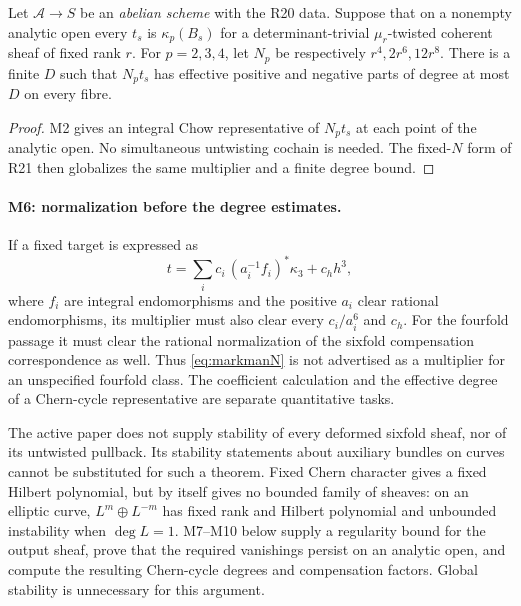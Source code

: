 \begin{proposition}\label{M4}
Let $\mathcal A\to S$ be an \emph{abelian scheme} with the R20 data. Suppose that on a nonempty analytic open every $t_s$ is $\kappa_p(B_s)$ for a determinant-trivial $\mu_r$-twisted coherent sheaf of fixed rank $r$. For $p=2,3,4$, let $N_p$ be respectively $r^4,2r^6,12r^8$. There is a finite $D$ such that $N_pt_s$ has effective positive and negative parts of degree at most $D$ on every fibre.
\end{proposition}
\begin{proof}
M2 gives an integral Chow representative of $N_pt_s$ at each point of the analytic open. No simultaneous untwisting cochain is needed. The fixed-$N$ form of R21 then globalizes the same multiplier and a finite degree bound.
\end{proof}

\paragraph{M6: normalization before the degree estimates.}
If a fixed target is expressed as
\[
 t=\sum_i c_i\,(a_i^{-1}f_i)^*\kappa_3+c_hh^3,
\]
where $f_i$ are integral endomorphisms and the positive $a_i$ clear rational endomorphisms, its multiplier must also clear every $c_i/a_i^6$ and $c_h$. For the fourfold passage it must clear the rational normalization of the sixfold compensation correspondence as well. Thus \eqref{eq:markmanN} is not advertised as a multiplier for an unspecified fourfold class. The coefficient calculation and the effective degree of a Chern-cycle representative are separate quantitative tasks.

The active paper does not supply stability of every deformed sixfold sheaf, nor of its untwisted pullback. Its stability statements about auxiliary bundles on curves cannot be substituted for such a theorem. Fixed Chern character gives a fixed Hilbert polynomial, but by itself gives no bounded family of sheaves: on an elliptic curve, $L^m\oplus L^{-m}$ has fixed rank and Hilbert polynomial and unbounded instability when $\deg L=1$. M7--M10 below supply a regularity bound for the output sheaf, prove that the required vanishings persist on an analytic open, and compute the resulting Chern-cycle degrees and compensation factors. Global stability is unnecessary for this argument.

